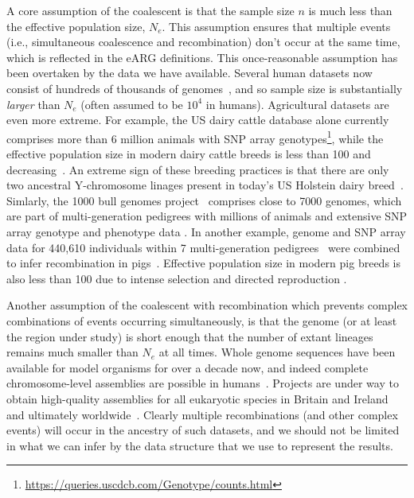 \documentclass{article}
\begin{document}
A core assumption of the coalescent is that the sample size $n$
is much less than the effective population size, $N_e$. This
assumption ensures that multiple events (i.e., simultaneous
coalescence and recombination) don't occur at the same
time, which is reflected in the eARG definitions.
This once-reasonable assumption has been overtaken by
the data we have available.
Several human datasets now consist of hundreds of thousands of
genomes~\citep{bycroft2018genome,karczewski2020mutational,tanjo2021practical},
and so sample size is substantially \emph{larger} than $N_e$
(often assumed to be $10^4$ in humans).
Agricultural datasets are even more extreme.
For example,
the US dairy cattle database alone currently comprises more than 6 million
animals with SNP array
genotypes\footnote{\url{https://queries.uscdcb.com/Genotype/counts.html}},
while the effective population size in modern dairy cattle breeds is
less than 100 and decreasing~\citep{MacLeod2013,Makanjuola2020}.
An extreme sign of these breeding practices is that there are only two ancestral
Y-chromosome linages present in today's US Holstein dairy breed~\citep{Yue2015}.
Simlarly, the 1000 bull genomes project~\citep{hayes20191000}
comprises close to 7000 genomes, which are part of multi-generation pedigrees
with millions of animals and extensive SNP array genotype and phenotype
data \citep[e.g.][]{Cesarani2022}.
In another example, genome and SNP array data for 440,610 individuals within
7 multi-generation pedigrees~\citep{whalen2018,Johnsson2021,Ros-Freixedes2020}
were combined to infer recombination in pigs~\citep{RosFreixedes2022}.
Effective population size in modern pig breeds is also less than 100 due to
intense selection and directed reproduction \citep{Hall2016,Porcnic2016}.

Another assumption of the coalescent with recombination which prevents complex
combinations of events occurring simultaneously, is that the genome (or
at least the region under study) is short enough that the number of extant
lineages remains much smaller than $N_e$ at all times. Whole
genome sequences have been available for model organisms
for over a decade now, %
and indeed complete chromosome-level assemblies are possible
in humans~\citep{miga2020telomere}.
Projects are under way to obtain high-quality assemblies
for all eukaryotic species in Britain and Ireland~\citep{darwin2022sequence}
and ultimately worldwide~\citep{lewin2022earth}.
Clearly multiple recombinations (and other complex events) will
occur in the ancestry of such datasets, and we should not be
limited in what we can infer by the data structure that we
use to represent the results.
\end{document}
